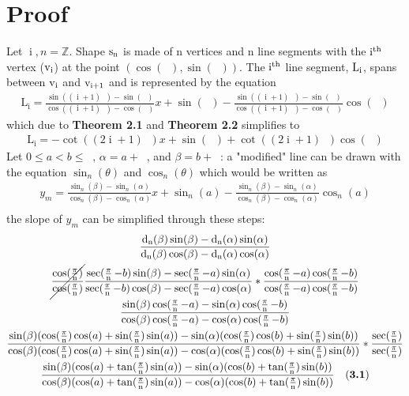 \documentclass[11pt]{article}
\DeclareMathOperator{\custd}{\mathrm{d}_n}
\DeclareMathOperator{\custi}{\mathrm{i}}
\DeclareMathOperator{\period}{\frac{2\pi}{n}}
\DeclareMathOperator{\hp}{\frac{\pi}{n}}
\DeclareMathOperator{\iperiod}{\custi\frac{2\pi}{n}}
\begin{document}
\section{Proof}
Let \(\custi,n=\mathbb{Z}\). Shape \(\rm s_n\) is made of n vertices and n line segments with the \(\rm i^{th}\) vertex (\(\rm v_i\)) at the point \((\cos(\iperiod), \sin(\iperiod))\). The \(\rm i^{th}\) line segment, \(\rm L_i\), spans between \(\rm v_i\) and \(\rm v_{i+1}\) and is represented by the equation
\begin{gather*}
\mathrm{L_i}=\frac{\sin((\custi+1)\period)-\sin(\iperiod)}{\cos((\custi+1)\period)-\cos(\iperiod)}x+\sin(\iperiod)-\frac{\sin((\custi+1)\period)-\sin(\iperiod)}{\cos((\custi+1)\period)-\cos(\iperiod)}\cos(\iperiod)
\end{gather*}
which due to \textbf{Theorem 2.1} and \textbf{Theorem 2.2} simplifies to
\begin{gather*}
\mathrm{L_i}=-\cot((2\custi+1)\hp)x+\sin(\iperiod)+\cot((2\custi+1)\hp)\cos(\iperiod)
\end{gather*}
Let \(0\leq a<b\leq\period\), \(\alpha=a+\iperiod\), and \(\beta=b+\iperiod\): a "modified" line can be drawn with the equation \(\sin_n(\theta)\) and \(\cos_n(\theta)\) which would be written as
\begin{gather*}
y_m=\frac{\sin_n(\beta)-\sin_n(\alpha)}{\cos_n(\beta)-\cos_n(\alpha)}x+\sin_n(a)-\frac{\sin_n(\beta)-\sin_n(\alpha)}{\cos_n(\beta)-\cos_n(\alpha)}\cos_n(a)\\
\end{gather*}
the slope of \(y_m\) can be simplified through these steps:
\begin{gather*}
\frac{\custd(\beta)\sin(\beta)-\custd(\alpha)\sin(\alpha)}{\custd(\beta)\cos(\beta)-\custd(\alpha)\cos(\alpha)}\\
\cancel{\frac{\cos(\hp)}{\cos(\hp)}}\frac{\sec(\hp-b)\sin(\beta)-\sec(\hp-a)\sin(\alpha)}{\sec(\hp-b)\cos(\beta)-\sec(\hp-a)\cos(\alpha)}*\frac{\cos(\hp-a)\cos(\hp-b)}{\cos(\hp-a)\cos(\hp-b)}\\
\frac{\sin(\beta)\cos(\hp-a)-\sin(\alpha)\cos(\hp-b)}{\cos(\beta)\cos(\hp-a)-\cos(\alpha)\cos(\hp-b)}\\
\frac{\sin(\beta)(\cos(\hp)\cos(a)+\sin(\hp)\sin(a))-\sin(\alpha)(\cos(\hp)\cos(b)+\sin(\hp)\sin(b))}{\cos(\beta)(\cos(\hp)\cos(a)+\sin(\hp)\sin(a))-\cos(\alpha)(\cos(\hp)\cos(b)+\sin(\hp)\sin(b))}*\frac{\sec(\hp)}{\sec(\hp)}\\
\frac{\sin(\beta)(\cos(a)+\tan(\hp)\sin(a))-\sin(\alpha)(\cos(b)+\tan(\hp)\sin(b))}{\cos(\beta)(\cos(a)+\tan(\hp)\sin(a))-\cos(\alpha)(\cos(b)+\tan(\hp)\sin(b))} \ \ \ \mathrm{(\textbf{3.1})}
\end{gather*}
\end{document}

